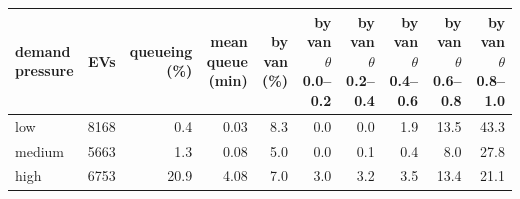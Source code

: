 \begin{tabular}{@{}lrrrrrrrrr@{}}
\toprule
\shortstack[l]{demand\\pressure} & EVs & \shortstack[r]{queueing\\(\%)} & \shortstack[r]{mean queue\\(min)} & \shortstack[r]{by van\\(\%)} & \shortstack[r]{by van\\$\theta$ 0.0--0.2} & \shortstack[r]{by van\\$\theta$ 0.2--0.4} & \shortstack[r]{by van\\$\theta$ 0.4--0.6} & \shortstack[r]{by van\\$\theta$ 0.6--0.8} & \shortstack[r]{by van\\$\theta$ 0.8--1.0} \\
\midrule
low & 8168 & 0.4 & 0.03 & 8.3 & 0.0 & 0.0 & 1.9 & 13.5 & 43.3 \\
medium & 5663 & 1.3 & 0.08 & 5.0 & 0.0 & 0.1 & 0.4 & 8.0 & 27.8 \\
high & 6753 & 20.9 & 4.08 & 7.0 & 3.0 & 3.2 & 3.5 & 13.4 & 21.1 \\
\bottomrule
\end{tabular}
